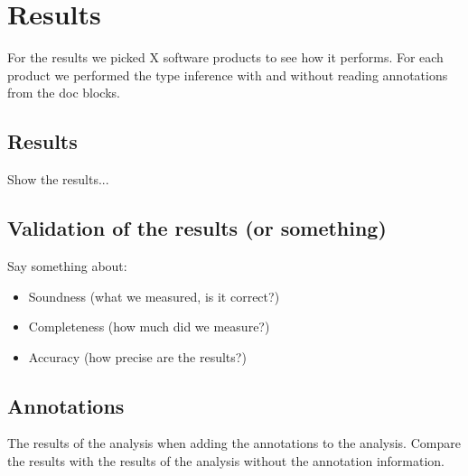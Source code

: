 \documentclass[main.tex]{subfiles}
\begin{document}
    \chapter{Results}\label{chap:results}
    For the results we picked X software products to see how it performs.
    For each product we performed the type inference with and without reading annotations from the doc blocks.
    
    \section{Results}
    Show the results...
    
    \section{Validation of the results (or something)}
    Say something about:
    \begin{itemize}
        \item Soundness (what we measured, is it correct?)
        \item Completeness (how much did we measure?)
        \item Accuracy (how precise are the results?)
    \end{itemize}

    \section{Annotations}
    The results of the analysis when adding the annotations to the analysis. Compare the results with the results of the analysis without the annotation information.
    
\end{document}
